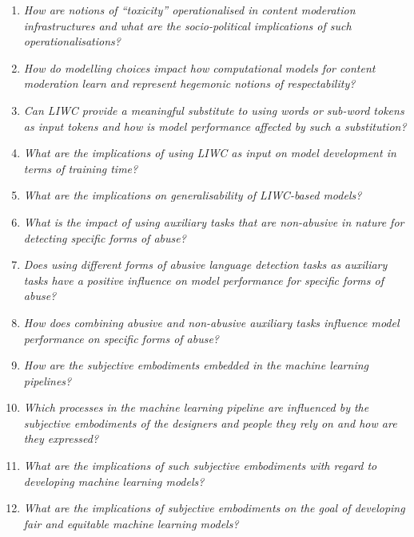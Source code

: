 \begin{center}
\begin{minipage}{0.9\textwidth}
\vspace{5mm}
    \begin{enumerate}[start=1, label={\textbf{RQ \arabic*}}]
        \item{\textit{How are notions of ``toxicity'' operationalised in content moderation infrastructures and what are the socio-political implications of such operationalisations?}}
        \item{\textit{How do modelling choices impact how computational models for content moderation learn and represent hegemonic notions of respectability?}}
        \item{\textit{Can LIWC provide a meaningful substitute to using words or sub-word tokens as input tokens and how is model performance affected by such a substitution?}}
        \item{\textit{What are the implications of using LIWC as input on model development in terms of training time?}}
        \item{\textit{What are the implications on generalisability of LIWC-based models?}}
        \item{\textit{What is the impact of using auxiliary tasks that are non-abusive in nature for detecting specific forms of abuse?}}
        \item{\textit{Does using different forms of abusive language detection tasks as auxiliary tasks have a positive influence on model performance for specific forms of abuse?}}
        \item{\textit{How does combining abusive and non-abusive auxiliary tasks influence model performance on specific forms of abuse?}}
        \item{\textit{How are the subjective embodiments embedded in the machine learning pipelines?}}
        \item{\textit{Which processes in the machine learning pipeline are influenced by the subjective embodiments of the designers and people they rely on and how are they expressed?}}
        \item{\textit{What are the implications of such subjective embodiments with regard to developing machine learning models?}}
        \item{\textit{What are the implications of subjective embodiments on the goal of developing fair and equitable machine learning models?}}
    \end{enumerate}
    \vspace{5mm}
\end{minipage}
\end{center}

